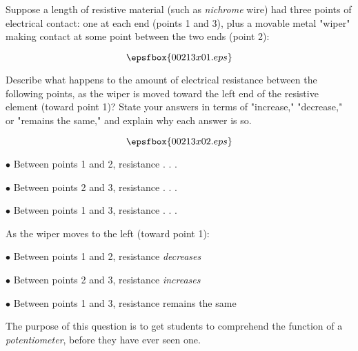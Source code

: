 

Suppose a length of resistive material (such as {\it nichrome} wire) had three points of electrical contact: one at each end (points 1 and 3), plus a movable metal "wiper" making contact at some point between the two ends (point 2):

$$\epsfbox{00213x01.eps}$$

Describe what happens to the amount of electrical resistance between the following points, as the wiper is moved toward the left end of the resistive element (toward point 1)?  State your answers in terms of "increase," "decrease," or "remains the same," and explain why each answer is so.
 
$$\epsfbox{00213x02.eps}$$

\medskip
\item{$\bullet$} Between points 1 and 2, resistance . . .
\item{$\bullet$} Between points 2 and 3, resistance . . .
\item{$\bullet$} Between points 1 and 3, resistance . . .
\medskip







As the wiper moves to the left (toward point 1):

\medskip
\item{$\bullet$} Between points 1 and 2, resistance {\it decreases}
\item{$\bullet$} Between points 2 and 3, resistance {\it increases}
\item{$\bullet$} Between points 1 and 3, resistance remains the same
\medskip







The purpose of this question is to get students to comprehend the function of a {\it potentiometer}, before they have ever seen one.




